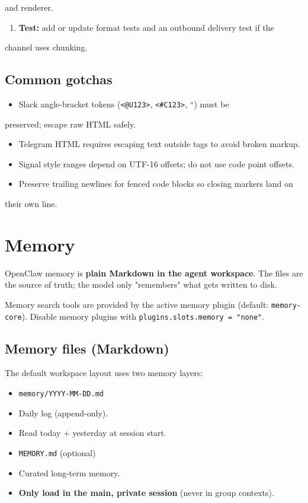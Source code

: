 and renderer.
\begin{enumerate}
  \item \textbf{Test:} add or update format tests and an outbound delivery test if the
\end{enumerate}

channel uses chunking.

\subsection{Common gotchas}


\begin{itemize}
  \item Slack angle-bracket tokens (\texttt{<@U123>}, \texttt{<\#C123>}, ``) must be
\end{itemize}

preserved; escape raw HTML safely.
\begin{itemize}
  \item Telegram HTML requires escaping text outside tags to avoid broken markup.
  \item Signal style ranges depend on UTF-16 offsets; do not use code point offsets.
  \item Preserve trailing newlines for fenced code blocks so closing markers land on
\end{itemize}

their own line.


\clearpage

\section{Memory}


OpenClaw memory is \textbf{plain Markdown in the agent workspace}. The files are the
source of truth; the model only "remembers" what gets written to disk.

Memory search tools are provided by the active memory plugin (default:
\texttt{memory-core}). Disable memory plugins with \texttt{plugins.slots.memory = "none"}.

\subsection{Memory files (Markdown)}


The default workspace layout uses two memory layers:

\begin{itemize}
  \item \texttt{memory/YYYY-MM-DD.md}
  \item Daily log (append-only).
  \item Read today + yesterday at session start.
  \item \texttt{MEMORY.md} (optional)
  \item Curated long-term memory.
  \item \textbf{Only load in the main, private session} (never in group contexts).
\end{itemize}


